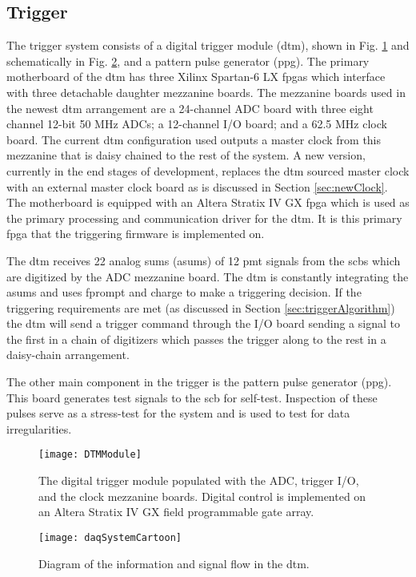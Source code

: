 \subsection{Trigger}
The trigger system consists of a digital trigger module (\gls{dtm}), shown in Fig. \ref{Fig:DTM} and schematically in Fig. \ref{Fig:daqSystemCartoon}, and a pattern pulse generator (\gls{ppg}). The primary motherboard of the \gls{dtm} has three Xilinx Spartan-6 LX \gls{fpga}s which interface with three detachable daughter mezzanine boards. The mezzanine boards used in the newest \gls{dtm} arrangement are a 24-channel ADC board with three eight channel 12-bit 50 MHz ADCs; a 12-channel I/O board; and a 62.5 MHz clock board. The current \gls{dtm} configuration used outputs a master clock from this mezzanine that is daisy chained to the rest of the system. A new version, currently in the end stages of development, replaces the \gls{dtm} sourced master clock with an external master clock board as is discussed in Section \ref{sec:newClock}. The motherboard is equipped with an Altera Stratix IV GX \gls{fpga} which is used as the primary processing and communication driver for the \gls{dtm}. It is this primary \gls{fpga} that the triggering firmware is implemented on.

The \gls{dtm} receives 22 analog sums (\gls{asum}s) of 12 \gls{pmt} signals from the \gls{scb}s which are digitized by the ADC mezzanine board. The \gls{dtm} is constantly integrating the \gls{asum}s and uses \gls{fprompt} and charge to make a triggering decision. If the triggering requirements are met (as discussed in Section \ref{sec:triggerAlgorithm}) the \gls{dtm} will send a trigger command through the I/O board sending a signal to the first in a chain of digitizers which passes the trigger along to the rest in a daisy-chain arrangement.

The other main component in the trigger is the pattern pulse generator (\gls{ppg}). This board generates test signals to the \gls{scb} for self-test. Inspection of these pulses serve as a stress-test for the system and is used to test for data irregularities.
\begin{figure}[ht]
\centering
\texttt{[image: DTMModule]}
\caption{The digital trigger module populated with the ADC, trigger I/O, and the clock mezzanine boards. Digital control is implemented on an Altera Stratix IV GX field programmable gate array.}
\label{Fig:DTM}
\end{figure}

\begin{figure}[ht]
\centering
\texttt{[image: daqSystemCartoon]}
\caption{Diagram of the information and signal flow in the \gls{dtm}.}
\label{Fig:daqSystemCartoon}
\end{figure}

